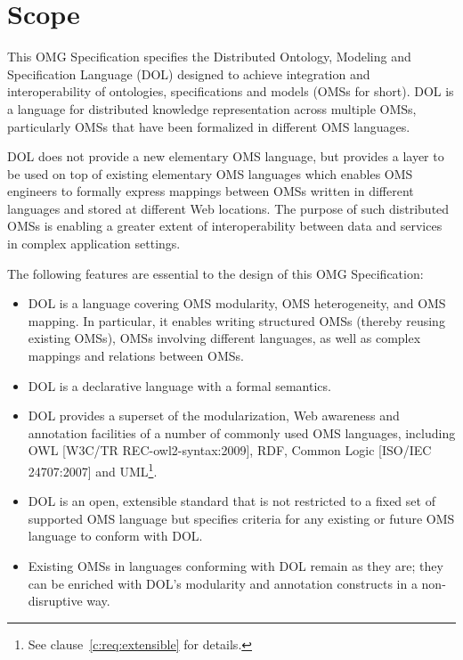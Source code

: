 \documentclass[10pt,%
\ifpretendfinal
final%
\else
draft%
\fi,
]{scrreprt}
\newcommand*{\nitem}[1]{[#1]}
\newcommand*{\IS}{OMG Specification\xspace}
\newcommand{\clauserefname}{clause}
\newcommand{\cref}[1]{\clauserefname~\ref{#1}}
\begin{document}
\chapter{Scope}
This \IS specifies the Distributed Ontology, Modeling and Specification Language (DOL) designed to achieve integration and interoperability of ontologies, specifications and models (OMSs for short). DOL is a language for distributed knowledge representation across multiple OMSs, particularly OMSs that have been formalized in different OMS languages.

DOL does not provide a new elementary OMS language, but provides a
layer to be used on top of existing elementary OMS languages which
enables OMS engineers to formally express mappings between OMSs written
in different languages and stored at different Web locations. The
purpose of such distributed OMSs is enabling a greater extent of
interoperability between data and services in complex application
settings.

The following features are essential to the design of this \IS:

\begin{itemize}
\item DOL is a language covering OMS modularity, OMS heterogeneity, and
OMS mapping. In particular, it enables writing structured OMSs
(thereby reusing existing OMSs), OMSs involving different languages,
as well as complex mappings and relations between OMSs.
\item DOL is a declarative language with a formal semantics.
\item DOL provides a superset of the modularization, Web awareness and annotation facilities of a number of commonly used OMS languages, including OWL \nitem{W3C/TR REC-owl2-syntax:2009}, RDF, Common Logic \nitem{ISO/IEC 24707:2007} and UML\footnote{See \cref{c:req:extensible} for details.}.
\item DOL is an open, extensible standard that is not restricted to a fixed set of supported OMS language but specifies criteria for any existing or future OMS language to conform with DOL.
\item Existing OMSs in languages conforming with DOL remain as they are; they can be enriched with DOL's modularity and annotation constructs in a non-disruptive way.
\end{itemize}
\end{document}
